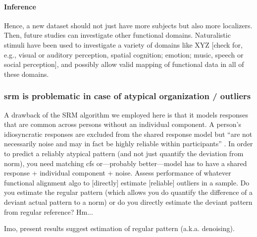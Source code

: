 \paragraph{Inference}



%
Hence, a new dataset should not just have more subjects but also more
localizers.
%
Then, future studies can investigate other functional domains.
%
Naturalistic stimuli have been used to investigate a variety of domains like XYZ
[check for, e.g., visual or auditory perception, spatial cognition; emotion;
music, speech or social perception], and possibly allow valid mapping of
functional data in all of these domains.


\subsubsection{\ac{srm} is problematic in case of atypical organization /
outliers}


%
A drawback of the SRM algorithm we employed here is that it models responses
that are common across persons without an individual component.
%
A person's idiosyncratic responses are excluded from the shared response model
but ``are not necessarily noise and may in fact be highly reliable within
participants'' \citep{cohen2017computational}.
%
In order to predict a reliably atypical pattern (and not just quantify the
deviation from norm), you need matching \ac{cfs} or---probably better---model
has to have a shared response + individual component + noise.
%
Assess performance of whatever functional alignment algo to [directly] estimate
[reliable] outliers in a sample.
%
Do you estimate the regular pattern (which allows you do quantify the difference
of a deviant actual pattern to a norm) or do you directly estimate the deviant
pattern from regular reference? Hm...

%
Imo, present results suggest estimation of regular pattern (a.k.a. denoising).


